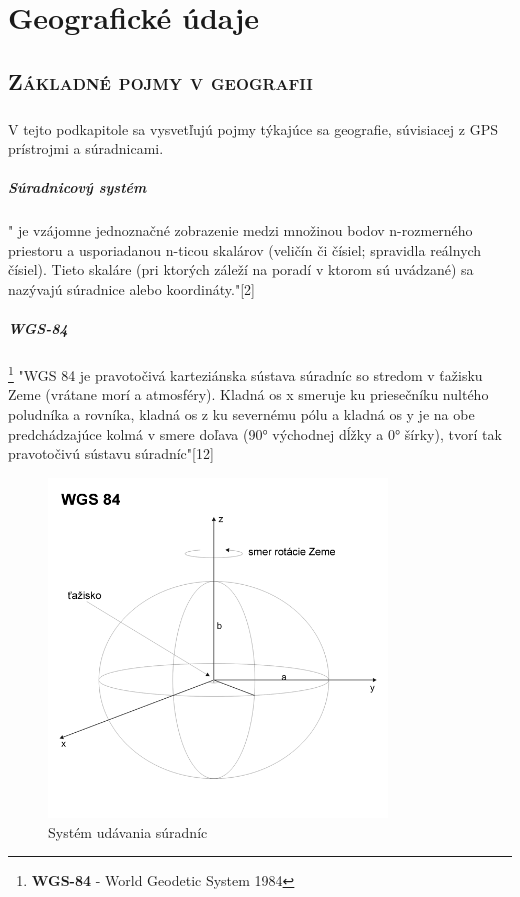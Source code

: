 \chapter{Geografické údaje}
\section{\textsc{Základné pojmy v geografii}}
\paragraph{}
V tejto podkapitole sa vysvetľujú pojmy týkajúce sa geografie, súvisiacej z GPS prístrojmi a súradnicami.
\paragraph{Súradnicový systém}
" je vzájomne jednoznačné zobrazenie medzi množinou bodov n-rozmerného priestoru
a usporiadanou n-ticou skalárov (veličín či čísiel; spravidla reálnych čísiel).
Tieto skaláre (pri ktorých záleží na poradí v ktorom sú uvádzané) sa nazývajú
súradnice alebo koordináty."[2]%
\paragraph{WGS-84}
\footnote{\textbf{WGS-84} - World Geodetic System 1984}
"WGS 84 je pravotočivá karteziánska sústava súradníc so stredom v ťažisku Zeme (vrátane morí a atmosféry). Kladná os x smeruje ku priesečníku nultého poludníka a rovníka, kladná os z ku severnému pólu a kladná os y je na obe predchádzajúce kolmá v smere doľava (90° východnej dĺžky a 0° šírky), tvorí tak pravotočivú sústavu súradníc"[12]

\begin{figure}[ht]
\centering
\includegraphics[height=9.0cm]{obr/Wgs84}
\caption{Systém udávania súradníc}
\end{figure}

